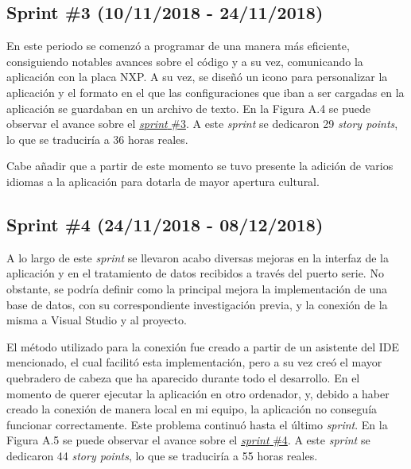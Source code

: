 \subsection{Sprint \#3 (10/11/2018 - 24/11/2018)}

En este periodo se comenzó a programar de una manera más eficiente, consiguiendo notables avances sobre el código y a su vez, comunicando la aplicación con la placa NXP. A su vez, se diseñó un icono para personalizar la aplicación y el formato en el que las configuraciones que iban a ser cargadas en la aplicación se guardaban en un archivo de texto. En la Figura A.4 se puede observar el avance sobre el \href{https://github.com/FranBurgos/TFG/milestone/4?closed=1}{\textit{sprint} \#3}. A este \textit{sprint} se dedicaron 29 \textit{story points}, lo que se traduciría a 36 horas reales.


Cabe añadir que a partir de este momento se tuvo presente la adición de varios idiomas a la aplicación para dotarla de mayor apertura cultural.

\subsection{Sprint \#4 (24/11/2018 - 08/12/2018)}

A lo largo de este \textit{sprint} se llevaron acabo diversas mejoras en la interfaz de la aplicación y en el tratamiento de datos recibidos a través del puerto serie. No obstante, se podría definir como la principal mejora la implementación de una base de datos, con su correspondiente investigación previa, y la conexión de la misma a Visual Studio y al proyecto. 

El método utilizado para la conexión fue creado a partir de un asistente del IDE mencionado, el cual facilitó esta implementación, pero a su vez creó el mayor quebradero de cabeza que ha aparecido durante todo el desarrollo. En el momento de querer ejecutar la aplicación en otro ordenador, y, debido a haber creado la conexión de manera local en mi equipo, la aplicación no conseguía funcionar correctamente. Este problema continuó hasta el último \textit{sprint}. En la Figura A.5 se puede observar el avance sobre el \href{https://github.com/FranBurgos/TFG/milestone/5?closed=1}{\textit{sprint} \#4}. A este \textit{sprint} se dedicaron 44 \textit{story points}, lo que se traduciría a 55 horas reales.


